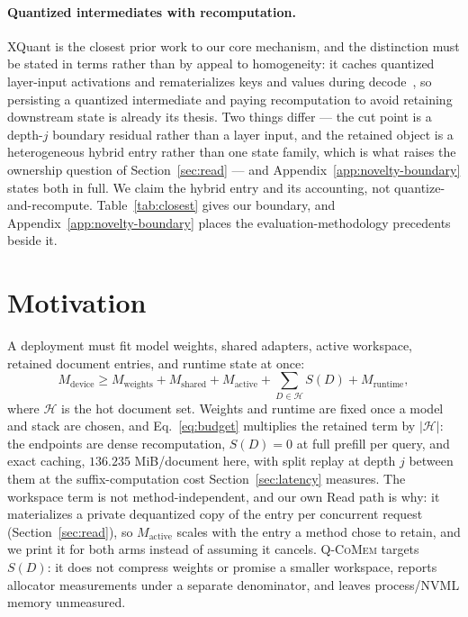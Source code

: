 \documentclass{article}
\newcommand{\qcomem}{\textsc{Q-CoMem}}
\begin{document}
\paragraph{Quantized intermediates with recomputation.}
XQuant is the closest prior work to our core mechanism, and the distinction must
be stated in terms rather than by appeal to homogeneity: it caches quantized
layer-input activations and rematerializes keys and values during
decode~\citep{tomar2025xquant}, so persisting a quantized intermediate and paying
recomputation to avoid retaining downstream state is already its thesis.  Two things differ --- the cut point is a depth-$j$ boundary residual rather
than a layer input, and the retained object is a heterogeneous hybrid entry
rather than one state family, which is what raises the ownership question of
Section~\ref{sec:read} --- and Appendix~\ref{app:novelty-boundary} states both
in full. We claim the hybrid entry and its accounting, not
quantize-and-recompute.
Table~\ref{tab:closest} gives our boundary, and
Appendix~\ref{app:novelty-boundary} places the evaluation-methodology
precedents beside it.

\section{Motivation}
\label{sec:motivation}

A deployment must fit model weights, shared adapters, active workspace, retained
document entries, and runtime state at once:
\begin{equation}
 M_{\mathrm{device}} \geq M_{\mathrm{weights}}+M_{\mathrm{shared}}
 +M_{\mathrm{active}}+\sum_{D\in\mathcal{H}}S(D)+M_{\mathrm{runtime}},
 \label{eq:budget}
\end{equation}
where $\mathcal{H}$ is the hot document set. Weights and runtime are fixed once a model and stack are chosen, and
Eq.~\ref{eq:budget} multiplies the retained term by $|\mathcal{H}|$: the endpoints are dense recomputation, $S(D)=0$ at full prefill per query, and
exact caching, $136.235$ MiB/document here, with split replay at depth $j$
between them at the suffix-computation cost Section~\ref{sec:latency}
measures.  The workspace term is not
method-independent, and our own Read path is why: it materializes a private
dequantized copy of the entry per concurrent request (Section~\ref{sec:read}), so
$M_{\mathrm{active}}$ scales with the entry a method chose to retain, and we
print it for both arms instead of assuming it cancels.  \qcomem{} targets
$S(D)$: it does not compress weights or promise a smaller workspace, reports
allocator measurements under a separate denominator, and leaves process/NVML
memory unmeasured.
\end{document}
